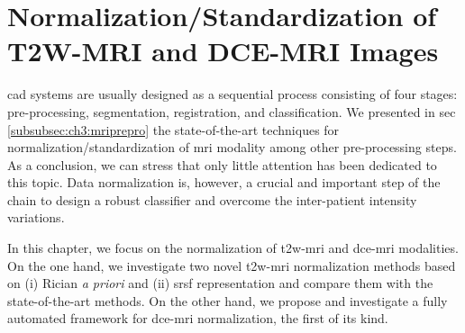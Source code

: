 \chapter{Normalization/Standardization of T2W-MRI and DCE-MRI Images} \label{chap:5}
\Ac{cad} systems are usually designed as a sequential process consisting of four stages: pre-processing, segmentation, registration, and classification.
We presented in \acs{sec}\,\ref{subsubsec:ch3:mriprepro} the state-of-the-art techniques for normalization/standardization of \ac{mri} modality among other pre-processing steps.
As a conclusion, we can stress that only little attention has been dedicated to this topic.
Data normalization is, however, a crucial and important step of the chain to design a robust classifier and overcome the inter-patient intensity variations.

In this chapter, we focus on the normalization of \ac{t2w}-\ac{mri} and \ac{dce}-\ac{mri} modalities.
On the one hand, we investigate two novel \ac{t2w}-\ac{mri} normalization methods based on (i) Rician \emph{a priori} and (ii) \ac{srsf} representation and compare them with the state-of-the-art methods.
On the other hand, we propose and investigate a fully automated framework for \ac{dce}-\ac{mri} normalization, the first of its kind.





